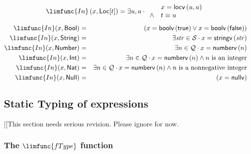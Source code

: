 \documentclass[12pt]{article}
\begin{document}
\begin{equation*}
\limfunc{In}\left( x,\mathsf{Loc}[t]\right) =\exists u,a\cdot 
\begin{array}{ll}
& x=\mathsf{locv}\left( u,a\right)  \\ 
\wedge  & t\equiv u%
\end{array}%
\end{equation*}%
\begin{eqnarray*}
\limfunc{In}(x,\mathsf{Bool}) &=&\left( x=\mathsf{boolv}\left( \mathsf{true}%
\right) \vee x=\mathsf{boolv}\left( \mathsf{false}\right) \right)  \\
\limfunc{In}(x,\mathsf{String}) &=&\exists \mathit{str}\in \mathcal{S}\cdot
x=\mathsf{stringv}\left( \mathit{str}\right)  \\
\limfunc{In}(x,\mathsf{Number}) &=&\exists n\in \mathcal{Q}\cdot x=\mathsf{%
numberv}\left( n\right)  \\
\limfunc{In}(x,\mathsf{Int}) &=&\exists n\in \mathcal{Q}\cdot x=\mathsf{%
numberv}\left( n\right) \wedge n\text{ is an integer} \\
\limfunc{In}(x,\mathsf{Nat}) &=&\exists n\in \mathcal{Q}\cdot x=\mathsf{%
numberv}\left( n\right) \wedge n\text{ is a nonnegative integer} \\
\limfunc{In}(x,\mathsf{Null}) &=&\left( x=\mathsf{nullv}\right) 
\end{eqnarray*}

\subsection{Static Typing of expressions}

[[This section needs serious revision. Please ignore for now.

\subsubsection{The $\limfunc{fType}$ function}
\end{document}
